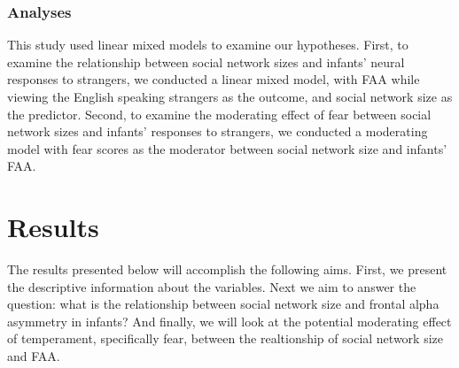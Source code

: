 \documentclass[
  man,
  floatsintext,
  longtable,
  nolmodern,
  notxfonts,
  notimes,
  colorlinks=true,linkcolor=blue,citecolor=blue,urlcolor=blue]{apa7}
\begin{document}
\subsubsection{Analyses}\label{sec-analyses}

This study used linear mixed models to examine our hypotheses. First, to
examine the relationship between social network sizes and infants'
neural responses to strangers, we conducted a linear mixed model, with
FAA while viewing the English speaking strangers as the outcome, and
social network size as the predictor. Second, to examine the moderating
effect of fear between social network sizes and infants' responses to
strangers, we conducted a moderating model with fear scores as the
moderator between social network size and infants' FAA.

\section{Results}\label{sec-results}

The results presented below will accomplish the following aims. First,
we present the descriptive information about the variables. Next we aim
to answer the question: what is the relationship between social network
size and frontal alpha asymmetry in infants? And finally, we will look
at the potential moderating effect of temperament, specifically fear,
between the realtionship of social network size and FAA.
\end{document}

